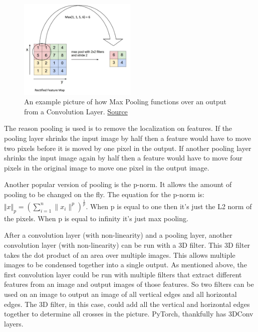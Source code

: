 \begin{figure}[ht]
  \centering
      \includegraphics[width=0.5\textwidth]{figs/MaxPooling.png}
          \caption{
            An example picture of how Max Pooling functions over an output from a Convolution Layer.
            \href{https://ulkarn.me/2016/08/11/intuitive-explanation-convnets/}{Source}
          }
\end{figure}

The reason pooling is used is to remove the localization on features.
If the pooling layer shrinks the input image by half then a feature would have to move two pixels before it is moved by one pixel in the output.
If another pooling layer shrinks the input image again by half then a feature would have to move four pixels in the original image to move one pixel in the output image.

Another popular version of pooling is the p-norm.
It allows the amount of pooling to be changed on the fly.
The equation for the p-norm is: $\Vert x\Vert _p = (\sum_{i=1}^{n} \|x_i\|^p)^{\frac{1}{p}}$.
When p is equal to one then it's just the L2 norm of the pixels.
When p is equal to infinity it's just max pooling.

After a convolution layer (with non-linearity) and a pooling layer, another convolution layer (with non-linearity) can be run with a 3D filter.
This 3D filter takes the dot product of an area over multiple images.
This allows multiple images to be condensed together into a single output. As mentioned above, the first convolution layer could be run with multiple filters that extract different features from an image and output images of those features. So two filters can be used on an image to output an image of all vertical edges and all horizontal edges.
The 3D filter, in this case, could add all the vertical and horizontal edges together to determine all crosses in the picture. PyTorch, thankfully has 3DConv layers.

